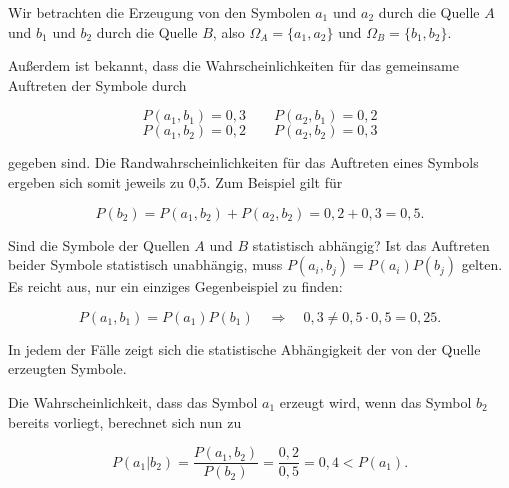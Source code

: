 \begin{beispiel}[Symbolquelle]
Wir betrachten die Erzeugung von den Symbolen $a_1$ und $a_2$ durch die Quelle $A$ und $b_1$ und $b_2$ durch die Quelle $B$, also $\Omega_A = \{a_1, a_2\}$ und $\Omega_B = \{b_1, b_2\}$.

Außerdem ist bekannt, dass die Wahrscheinlichkeiten für das gemeinsame Auftreten der Symbole durch

$$
P(a_1, b_1) = 0{,}3 \qquad P(a_2, b_1) = 0{,}2
$$
$$
P(a_1, b_2) = 0{,}2 \qquad P(a_2, b_2) = 0{,}3
$$

gegeben sind. Die Randwahrscheinlichkeiten für das Auftreten eines Symbols ergeben sich somit jeweils zu 0{,}5. Zum Beispiel gilt für

$$
P(b_2) = P(a_1, b_2) + P(a_2, b_2) = 0{,}2 + 0{,}3 = 0{,}5.
$$

Sind die Symbole der Quellen $A$ und $B$ statistisch abhängig? Ist das Auftreten beider Symbole statistisch unabhängig, muss $P(a_i, b_j) = P(a_i)P(b_j)$ gelten. Es reicht aus, nur ein einziges Gegenbeispiel zu finden:

$$
P(a_1, b_1) = P(a_1)P(b_1) \quad \Rightarrow \quad 0{,}3 \neq 0{,}5 \cdot 0{,}5 = 0{,}25.
$$

In jedem der Fälle zeigt sich die statistische Abhängigkeit der von der Quelle erzeugten Symbole.

Die Wahrscheinlichkeit, dass das Symbol $a_1$ erzeugt wird, wenn das Symbol $b_2$ bereits vorliegt, berechnet sich nun zu

$$
P(a_1|b_2) = \frac{P(a_1, b_2)}{P(b_2)} = \frac{0{,}2}{0{,}5} = 0{,}4 < P(a_1).
$$
\end{beispiel}

